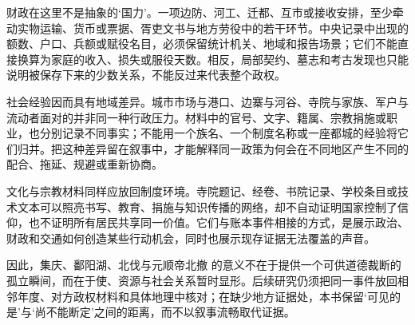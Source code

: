 财政在这里不是抽象的‘国力’。一项边防、河工、迁都、互市或接收安排，至少牵动实物运输、货币或票据、胥吏文书与地方劳役中的若干环节。中央记录中出现的额数、户口、兵额或赋役名目，必须保留统计机关、地域和报告场景；它们不能直接换算为家庭的收入、损失或服役天数。相反，局部契约、墓志和考古发现也只能说明被保存下来的少数关系，不能反过来代表整个政权。

社会经验因而具有地域差异。城市市场与港口、边寨与河谷、寺院与家族、军户与流动者面对的并非同一种行政压力。材料中的官号、文字、籍属、宗教捐施或职业，也分别记录不同事实；不能用一个族名、一个制度名称或一座都城的经验将它们归并。把这种差异留在叙事中，才能解释同一政策为何会在不同地区产生不同的配合、拖延、规避或重新协商。

文化与宗教材料同样应放回制度环境。寺院题记、经卷、书院记录、学校条目或技术文本可以照亮书写、教育、捐施与知识传播的网络，却不自动证明国家控制了信仰，也不证明所有居民共享同一价值。它们与账本事件相接的方式，是展示政治、财政和交通如何创造某些行动机会，同时也展示现存证据无法覆盖的声音。

因此，集庆、鄱阳湖、北伐与元顺帝北撤 的意义不在于提供一个可供道德裁断的孤立瞬间，而在于使、资源与社会关系暂时显形。后续研究仍须把同一事件放回相邻年度、对方政权材料和具体地理中核对；在缺少地方证据处，本书保留‘可见的是’与‘尚不能断定’之间的距离，而不以叙事流畅取代证据。

